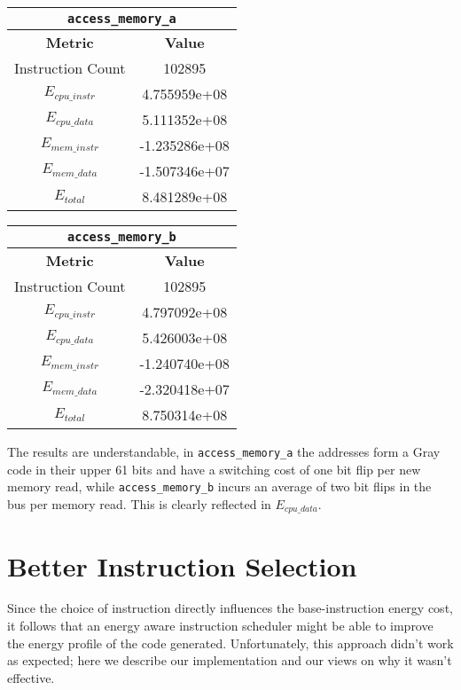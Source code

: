 \begin{center}
  \begin{tabular}{ | c | c | }
    \hline
    \multicolumn{2}{|c|}{\texttt{access\_memory\_a}} \\
    \hline

    \textbf{Metric} & \textbf{Value} \\
    \hline

    Instruction Count &  102895 \\
    $E_{cpu\_instr}$ & 4.755959e+08 \\
    $E_{cpu\_data}$ & 5.111352e+08 \\
    $E_{mem\_instr}$ &  -1.235286e+08 \\
    $E_{mem\_data}$ & -1.507346e+07 \\
    $E_{total}$ & 8.481289e+08 \\
    \hline
  \end{tabular}
  \quad
  \begin{tabular}{ | c | c | }
    \hline
    \multicolumn{2}{|c|}{\texttt{access\_memory\_b}} \\
    \hline

    \textbf{Metric} & \textbf{Value} \\
    \hline

    Instruction Count &  102895 \\
    $E_{cpu\_instr}$ &  4.797092e+08 \\
    $E_{cpu\_data}$ &  5.426003e+08 \\
    $E_{mem\_instr}$ &  -1.240740e+08 \\
    $E_{mem\_data}$ &  -2.320418e+07 \\
    $E_{total}$ & 8.750314e+08 \\
    \hline
  \end{tabular}
\end{center}

The results are understandable, in \texttt{access\_memory\_a} the
addresses form a Gray code in their upper 61 bits and have a switching
cost of one bit flip per new memory read, while
\texttt{access\_memory\_b} incurs an average of two bit flips in the
bus per memory read.  This is clearly reflected in $E_{cpu\_data}$.

\section{Better Instruction Selection}

Since the choice of instruction directly influences the
base-instruction energy cost, it follows that an energy aware
instruction scheduler might be able to improve the energy profile of
the code generated.  Unfortunately, this approach didn't work as
expected; here we describe our implementation and our views on why it
wasn't effective.

